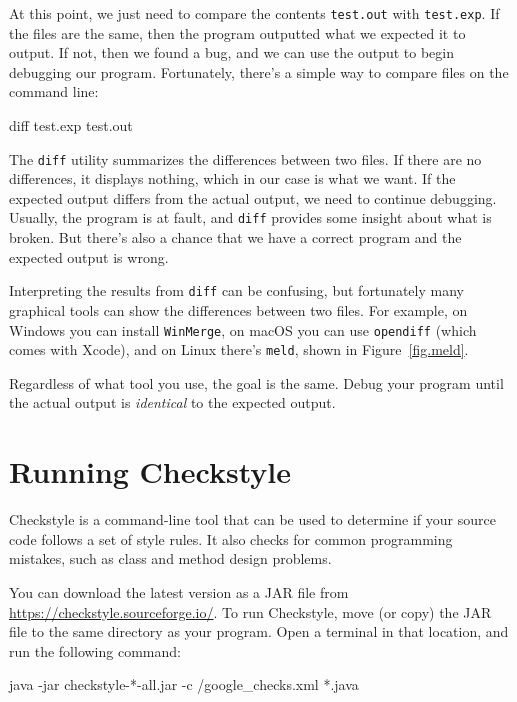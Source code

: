 At this point, we just need to compare the contents {\tt test.out} with {\tt test.exp}.
If the files are the same, then the program outputted what we expected it to output.
If not, then we found a bug, and we can use the output to begin debugging our program.
Fortunately, there's a simple way to compare files on the command line:

\begin{stdout}
diff test.exp test.out
\end{stdout}

The {\tt diff} utility summarizes the differences between two files.
If there are no differences, it displays nothing, which in our case is what we want.
If the expected output differs from the actual output, we need to continue debugging.
Usually, the program is at fault, and {\tt diff} provides some insight about what is broken.
But there's also a chance that we have a correct program and the expected output is wrong.

Interpreting the results from {\tt diff} can be confusing, but fortunately many graphical tools can show the differences between two files.
For example, on Windows you can install {\tt WinMerge}, on macOS you can use {\tt opendiff} (which comes with Xcode), and on Linux there's {\tt meld}, shown in Figure~\ref{fig.meld}.

Regardless of what tool you use, the goal is the same.
Debug your program until the actual output is {\em identical} to the expected output.


\section{Running Checkstyle}
\label{tools_running-checkstyle}


Checkstyle is a command-line tool that can be used to determine if your source code follows a set of style rules.
It also checks for common programming mistakes, such as class and method design problems.

You can download the latest version as a JAR file from \url{https://checkstyle.sourceforge.io/}.
To run Checkstyle, move (or copy) the JAR file to the same directory as your program.
Open a terminal in that location, and run the following command:

\begin{stdout}
java -jar checkstyle-*-all.jar -c /google_checks.xml *.java
\end{stdout}

